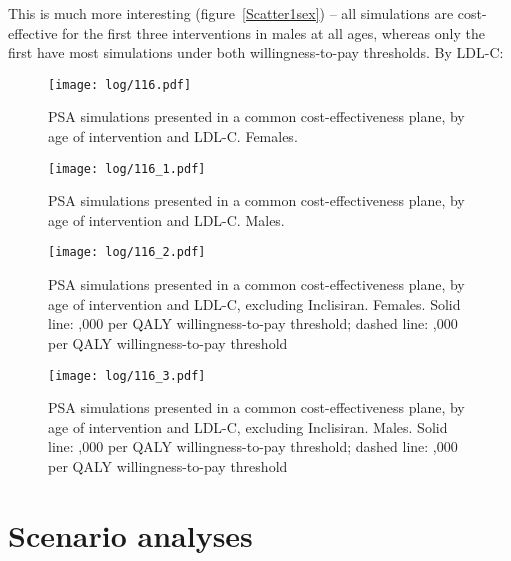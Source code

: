 \documentclass[11pt]{article}
\begin{document}
This is much more interesting (figure~\ref{Scatter1sex}) -- 
all simulations are cost-effective for the first three interventions in males at all ages,
whereas only the first have most simulations under both willingness-to-pay thresholds.
By LDL-C: 

\color{Blue4}
\begin{stlog}\end{stlog}
\begin{figure}
    \centering
    \texttt{[image: log/116.pdf]}
    \caption{PSA simulations presented in a common cost-effectiveness plane, by age of intervention and LDL-C. Females.}
    \label{Scatter0sexldl0}
\end{figure}
\begin{figure}
    \centering
    \texttt{[image: log/116\_1.pdf]}
    \caption{PSA simulations presented in a common cost-effectiveness plane, by age of intervention and LDL-C. Males.}
    \label{Scatter0sexldl1}
\end{figure}
\begin{figure}
    \centering
    \texttt{[image: log/116\_2.pdf]}
    \caption{PSA simulations presented in a common cost-effectiveness plane, by age of intervention and LDL-C, excluding Inclisiran. Females. Solid line: ,000 per QALY willingness-to-pay threshold; dashed line: ,000 per QALY willingness-to-pay threshold}
    \label{Scatter0sexldl0}
\end{figure}
\begin{figure}
    \centering
    \texttt{[image: log/116\_3.pdf]}
    \caption{PSA simulations presented in a common cost-effectiveness plane, by age of intervention and LDL-C, excluding Inclisiran. Males. Solid line: ,000 per QALY willingness-to-pay threshold; dashed line: ,000 per QALY willingness-to-pay threshold}
    \label{Scatter0sexldl1}
\end{figure}
\begin{stlog}\end{stlog}
\color{black}

\clearpage
\pagebreak
\section{Scenario analyses}
\label{Sceansec}
\end{document}
